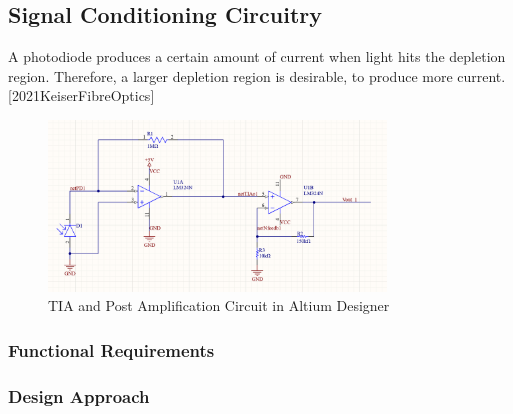 \subsection{Signal Conditioning Circuitry} %
\label{subsec:SignalConditioningCircuitry}
A photodiode produces a certain amount of current when light hits the depletion region. Therefore, a larger depletion region is desirable, to produce more current. [2021KeiserFibreOptics]
%
\begin{figure}[htbp] %
    \centering
    \includegraphics[width=0.8\textwidth]{chapters/methodology/prototype/AltiumSingleCircuit.png}
    \caption{TIA and Post Amplification Circuit in Altium Designer}
    \label{fig:AltiumDis}
  \end{figure}

\subsubsection{Functional Requirements}

\subsubsection{Design Approach}

